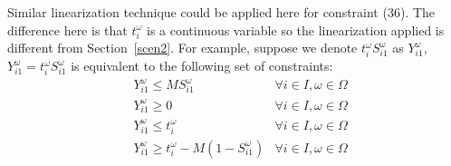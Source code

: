 \documentclass[11pt]{article}
\begin{document}
		Similar linearization technique could be applied here for constraint (36). The difference here is that \(t_i^\omega\) is a continuous variable so the linearization applied is different from Section~\ref{scen2}. For example, suppose we denote \(t_{i}^\omega S_{i1}^\omega\) as \(Y_{i1}^\omega\), \(Y_{i1}^\omega = t_{i}^\omega S_{i1}^\omega\) is equivalent to the following set of constraints:
		\begin{align*}
			& Y_{i1}^\omega \leq MS_{i1}^\omega & \forall i \in I, \omega \in \Omega\\
			& Y_{i1}^\omega \geq 0 & \forall i \in I, \omega \in \Omega\\
			& Y_{i1}^\omega \leq t_i^\omega & \forall i \in I, \omega \in \Omega\\
			& Y_{i1}^\omega \geq t_i^\omega - M(1-S_{i1}^\omega) & \forall i \in I, \omega \in \Omega
		\end{align*}
\end{document}
